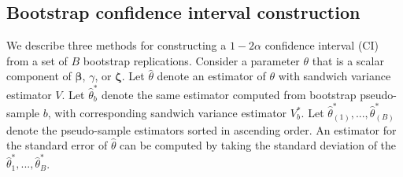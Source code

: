 \documentclass[
  american,
  man, donotrepeattitle,mask,floatsintext]{apa7}
\numberwithin{table}{section}
\numberwithin{equation}{section}
\numberwithin{figure}{section}
\begin{document}
\subsection*{Bootstrap confidence interval construction}\label{bootstrap-confidence-interval-construction}

We describe three methods for constructing a \(1 - 2\alpha\) confidence interval (CI) from a set of \(B\) bootstrap replications.
Consider a parameter \(\theta\) that is a scalar component of \(\boldsymbol\beta\), \(\gamma\), or \(\boldsymbol\zeta\).
Let \(\hat\theta\) denote an estimator of \(\theta\) with sandwich variance estimator \(V\).
Let \(\hat\theta^*_{b}\) denote the same estimator computed from bootstrap pseudo-sample \(b\), with corresponding sandwich variance estimator \(V^*_{b}\).
Let \(\hat\theta^*_{(1)},...,\hat\theta^*_{(B)}\) denote the pseudo-sample estimators sorted in ascending order.
An estimator for the standard error of \(\hat\theta\) can be computed by taking the standard deviation of the \(\hat\theta^*_1,...,\hat\theta^*_{B}\).
\end{document}
